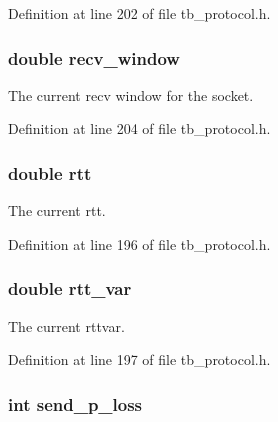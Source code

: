 Definition at line 202 of file tb\-\_\-protocol.\-h.

\hypertarget{structtb__prot__stats__t_a74c7641a53b9b24b7b8941937450b2f5}{
\subsubsection[{recv\-\_\-window}]{\setlength{\rightskip}{0pt plus 5cm}double recv\-\_\-window}}\label{structtb__prot__stats__t_a74c7641a53b9b24b7b8941937450b2f5}


The current recv window for the socket. 



Definition at line 204 of file tb\-\_\-protocol.\-h.

\hypertarget{structtb__prot__stats__t_abc953dca5930a67736d6cd8f72353794}{
\subsubsection[{rtt}]{\setlength{\rightskip}{0pt plus 5cm}double rtt}}\label{structtb__prot__stats__t_abc953dca5930a67736d6cd8f72353794}


The current rtt. 



Definition at line 196 of file tb\-\_\-protocol.\-h.

\hypertarget{structtb__prot__stats__t_adef6e52b2e3ac2f1f1369e40f3f515e3}{
\subsubsection[{rtt\-\_\-var}]{\setlength{\rightskip}{0pt plus 5cm}double rtt\-\_\-var}}\label{structtb__prot__stats__t_adef6e52b2e3ac2f1f1369e40f3f515e3}


The current rttvar. 



Definition at line 197 of file tb\-\_\-protocol.\-h.

\hypertarget{structtb__prot__stats__t_a0bd7c47cdd9a90293b61401e8e408569}{
\subsubsection[{send\-\_\-p\-\_\-loss}]{\setlength{\rightskip}{0pt plus 5cm}int send\-\_\-p\-\_\-loss}}\label{structtb__prot__stats__t_a0bd7c47cdd9a90293b61401e8e408569}


